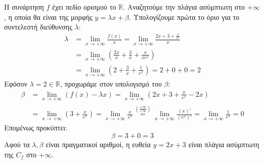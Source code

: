 
\lysh
Η συνάρτηση $f$ έχει πεδίο ορισμού το $\mathbb{R}$. Αναζητούμε την πλάγια ασύμπτωτη στο $+\infty$, η οποία θα είναι της μορφής $y = \lambda x + \beta$.
Υπολογίζουμε πρώτα το όριο για το συντελεστή διεύθυνσης $\lambda$:
\begin{align*}
\lambda &= \lim\limits_{x\to +\infty} \frac{f(x)}{x} = \lim\limits_{x\to +\infty} \frac{2x + 3 + \frac{x}{e^x}}{x} \\
&= \lim\limits_{x\to +\infty} \left( \frac{2x}{x} + \frac{3}{x} + \frac{x}{x e^x} \right) \\
&= \lim\limits_{x\to +\infty} \left( 2 + \frac{3}{x} + \frac{1}{e^x} \right) = 2 + 0 + 0 = 2
\end{align*}
Εφόσον $\lambda = 2 \in \mathbb{R}$, προχωράμε στον υπολογισμό του $\beta$:
\begin{align*}
\beta &= \lim\limits_{x\to +\infty} (f(x) - \lambda x) = \lim\limits_{x\to +\infty} \left( 2x + 3 + \frac{x}{e^x} - 2x \right) \\
&= \lim\limits_{x\to +\infty} \left( 3 + \frac{x}{e^x} \right)=
\lim\limits_{x\to +\infty} \frac{x}{e^x} \overset{\left(\frac{+\infty}{+\infty}\right)}{=} \lim\limits_{x\to +\infty} \frac{(x)'}{(e^x)'} = \lim\limits_{x\to +\infty} \frac{1}{e^x} = 0
\end{align*}
Επομένως προκύπτει:
\[ \beta = 3 + 0 = 3 \]
Αφού τα $\lambda, \beta$ είναι πραγματικοί αριθμοί, η ευθεία $y = 2x + 3$ είναι πλάγια ασύμπτωτη της $C_f$ στο $+\infty$.

